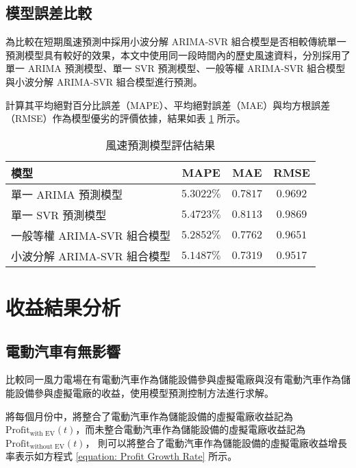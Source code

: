 \subsection{模型誤差比較}

為比較在短期風速預測中採用小波分解 ARIMA-SVR 組合模型是否相較傳統單一預測模型具有較好的效果，本文中使用同一段時間內的歷史風速資料，分別採用了單一 ARIMA 預測模型、單一 SVR 預測模型、一般等權 ARIMA-SVR 組合模型與小波分解 ARIMA-SVR 組合模型進行預測。

計算其平均絕對百分比誤差（MAPE）、平均絕對誤差（MAE）與均方根誤差（RMSE）作為模型優劣的評價依據，結果如表 \ref{table: Time Series Model Result} 所示。

\begin{table}[htp]
  \centering
  \caption[風速預測模型評估結果]{風速預測模型評估結果}
  \begin{tabular}{lccc}
    \toprule
    \textbf{模型}               & \textbf{MAPE} & \textbf{MAE} & \textbf{RMSE} \\
    \midrule
    單一 ARIMA 預測模型         & $5.3022 \%$   & $0.7817$     & $0.9692$      \\
    單一 SVR 預測模型           & $5.4723 \%$   & $0.8113$     & $0.9869$      \\
    一般等權 ARIMA-SVR 組合模型 & $5.2852 \%$   & $0.7762$     & $0.9651$      \\
    小波分解 ARIMA-SVR 組合模型 & $5.1487 \%$   & $0.7319$     & $0.9517$      \\
    \bottomrule
  \end{tabular}
  \label{table: Time Series Model Result}
\end{table}

\section{收益結果分析}

\subsection{電動汽車有無影響}

比較同一風力電場在有電動汽車作為儲能設備參與虛擬電廠與沒有電動汽車作為儲能設備參與虛擬電廠的收益，使用模型預測控制方法進行求解。

將每個月份中，將整合了電動汽車作為儲能設備的虛擬電廠收益記為 $\text{Profit}_{\text{with EV}}(t)$，而未整合電動汽車作為儲能設備的虛擬電廠收益記為 $\text{Profit}_{\text{without EV}}(t)$，
則可以將整合了電動汽車作為儲能設備的虛擬電廠收益增長率表示如方程式 \eqref{equation: Profit Growth Rate} 所示。

